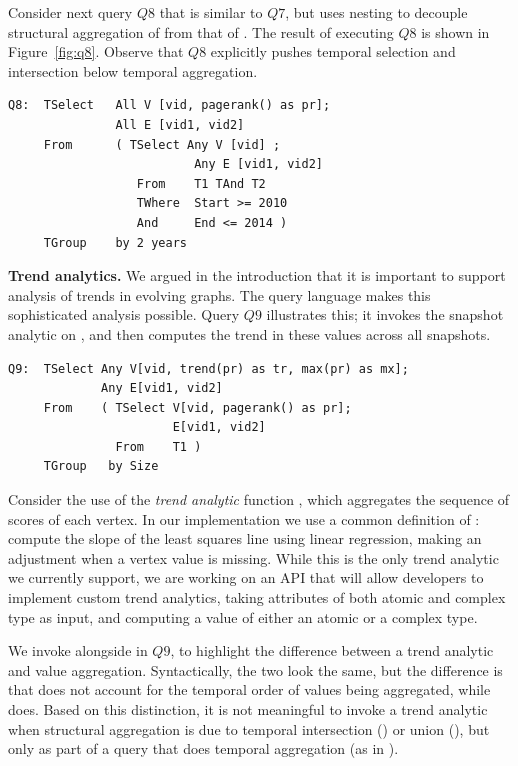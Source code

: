 Consider next query $Q8$ that is similar to $Q7$, but uses nesting to
decouple structural aggregation of  from that of
. The result of executing $Q8$ is shown in
Figure~\ref{fig:q8}.  Observe that $Q8$ explicitly pushes temporal
selection and intersection below temporal aggregation.

\begin{small}
\begin{verbatim}
Q8:  TSelect   All V [vid, pagerank() as pr];
               All E [vid1, vid2]
     From      ( TSelect Any V [vid] ; 
                          Any E [vid1, vid2]
                  From    T1 TAnd T2
                  TWhere  Start >= 2010 
                  And     End <= 2014 )
     TGroup    by 2 years
\end{verbatim}
\end{small}

{\bf Trend analytics.} We argued in the introduction that it is
important to support analysis of trends in evolving graphs.  The \ql
query language makes this sophisticated analysis possible.  Query $Q9$
illustrates this; it invokes the snapshot analytic 
on , and then computes the trend in these values across all
snapshots.

\begin{small}
\begin{verbatim}
Q9:  TSelect Any V[vid, trend(pr) as tr, max(pr) as mx];
             Any E[vid1, vid2]  
     From    ( TSelect V[vid, pagerank() as pr];   
                       E[vid1, vid2]
               From    T1 )
     TGroup   by Size
\end{verbatim}
\end{small}

Consider the use of the {\em trend analytic} function
, which aggregates the sequence of 
scores of each vertex.  In our implementation we use a common
definition of : compute the slope of the least squares
line using linear regression, making an adjustment when a vertex value
is missing.  While this is the only trend analytic we currently
support, we are working on an API that will allow developers to
implement custom trend analytics, taking attributes of both atomic and
complex type as input, and computing a value of either an atomic or a
complex type.

We invoke  alongside  in $Q9$, to
highlight the difference between a trend analytic and value
aggregation.  Syntactically, the two look the same, but the difference
is that  does not account for the temporal order of
values being aggregated, while  does.  Based on this
distinction, it is not meaningful to invoke a trend analytic when
structural aggregation is due to temporal intersection ()
or union (), but only as part of a query that does temporal
aggregation (as in ).


